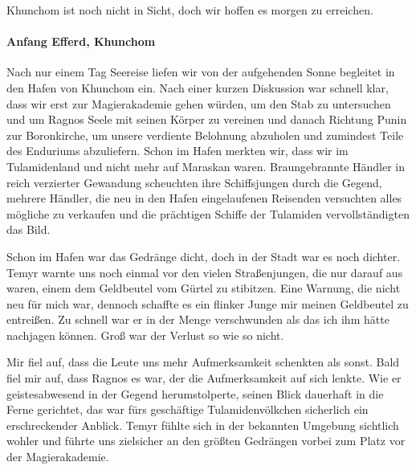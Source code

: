 Khunchom ist noch nicht in Sicht, doch wir hoffen es morgen zu erreichen.

\paragraph{Anfang Efferd, Khunchom}
Nach nur einem Tag Seereise liefen wir von der aufgehenden Sonne begleitet in den Hafen von Khunchom ein. Nach einer kurzen Diskussion war schnell klar, dass wir erst zur Magierakademie gehen würden, um den Stab zu untersuchen und um Ragnos Seele mit seinen Körper zu vereinen und danach Richtung Punin zur Boronkirche, um unsere verdiente Belohnung abzuholen und zumindest Teile des Enduriums abzuliefern. Schon im Hafen merkten wir, dass wir im Tulamidenland und nicht mehr auf Maraskan waren. Braungebrannte Händler in reich verzierter Gewandung scheuchten ihre Schiffsjungen durch die Gegend, mehrere Händler, die neu in den Hafen eingelaufenen Reisenden versuchten alles mögliche zu verkaufen und die prächtigen Schiffe der Tulamiden vervollständigten das Bild. 

Schon im Hafen war das Gedränge dicht, doch in der Stadt war es noch dichter. Temyr warnte uns noch einmal vor den vielen Straßenjungen, die nur darauf aus waren, einem dem Geldbeutel vom Gürtel zu stibitzen. Eine Warnung, die nicht neu für mich war, dennoch schaffte es ein flinker Junge mir meinen Geldbeutel zu entreißen. Zu schnell war er in der Menge verschwunden als das ich ihm hätte nachjagen können. Groß war der Verlust so wie so nicht. 

Mir fiel auf, dass die Leute uns mehr Aufmerksamkeit schenkten als sonst. Bald fiel mir auf, dass Ragnos es war, der die Aufmerksamkeit auf sich lenkte. Wie er geistesabwesend in der Gegend herumstolperte, seinen Blick dauerhaft in die Ferne gerichtet, das war fürs geschäftige Tulamidenvölkchen sicherlich ein erschreckender Anblick. Temyr fühlte sich in der bekannten Umgebung sichtlich wohler und führte uns zielsicher an den größten Gedrängen vorbei zum Platz vor der Magierakademie. 

